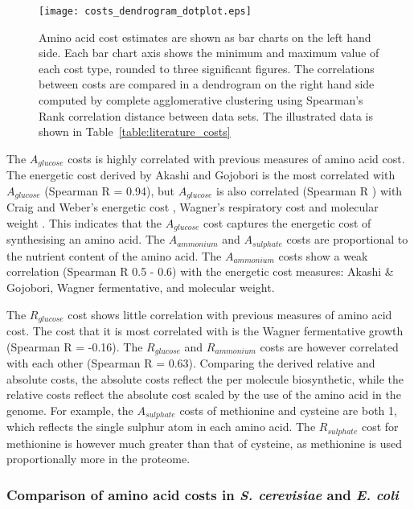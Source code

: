 \begin{sidewaysfigure}
\centering
\texttt{[image: costs\_dendrogram\_dotplot.eps]}
\caption[Comparison of amino acid cost estimates]{Amino acid cost estimates are shown as bar charts on the left hand side. Each bar chart axis shows the minimum and maximum value of each cost type, rounded to three significant figures. The correlations between costs are compared in a dendrogram on the right hand side computed by complete agglomerative clustering using Spearman's Rank correlation distance between data sets. The illustrated data is shown in Table~\vref{table:literature_costs}}
\label{figure:costs_dendrogram_dotplot}
\end{sidewaysfigure}

The $A_{glucose}$ costs is highly correlated with previous measures of amino acid cost. The energetic cost derived by Akashi and Gojobori \cite{akashi2002} is the most correlated with $A_{glucose}$ (Spearman R = 0.94), but $A_{glucose}$ is also correlated (Spearman R ) with Craig and Weber's energetic cost \cite{craig1998}, Wagner's respiratory cost \cite{wagner2005} and molecular weight \cite{seligmann2003}. This indicates that the $A_{glucose}$ cost captures the energetic cost of synthesising an amino acid. The $A_{ammonium}$ and $A_{sulphate}$ costs are proportional to the nutrient content of the amino acid. The $A_{ammonium}$ costs show a weak correlation (Spearman R 0.5 - 0.6) with the energetic cost measures: Akashi \& Gojobori, Wagner fermentative, and molecular weight.

The $R_{glucose}$ cost shows little correlation with previous measures of amino acid cost. The cost that it is most correlated with is the Wagner fermentative growth (Spearman R = -0.16). The $R_{glucose}$ and $R_{ammonium}$ costs are however correlated with each other (Spearman R = 0.63). Comparing the derived relative and absolute costs, the absolute costs reflect the per molecule biosynthetic, while the relative costs reflect the absolute cost scaled by the use of the amino acid in the genome. For example, the $A_{sulphate}$ costs of methionine and cysteine are both 1, which reflects the single sulphur atom in each amino acid. The $R_{sulphate}$ cost for methionine is however much greater than that of cysteine, as methionine is used proportionally more in the proteome.

\subsubsection{Comparison of amino acid costs in \emph{S. cerevisiae} and \emph{E. coli}}

